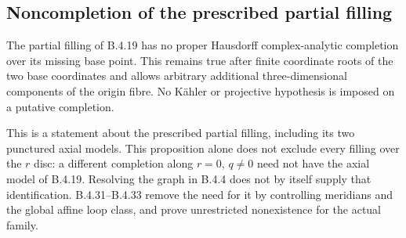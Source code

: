 \subsection{Noncompletion of the prescribed partial filling}

\begin{proposition}
\label{push:B430}
The partial filling of B.4.19 has no proper
Hausdorff complex-analytic completion over its
missing base point. This remains true after finite
coordinate roots of the two base coordinates and
allows arbitrary additional three-dimensional
components of the origin fibre. No K\"ahler or
projective hypothesis is imposed on a putative
completion.

This is a statement about the prescribed partial
filling, including its two punctured axial models.
This proposition alone does not exclude every filling
over the $r$ disc: a different completion along
$r=0$, $q\ne0$ need not have the axial model of
B.4.19. Resolving the graph in B.4.4 does not by
itself supply that identification. B.4.31--B.4.33
remove the need for it by controlling meridians and
the global affine loop class, and prove unrestricted
nonexistence for the actual family.
\end{proposition}

